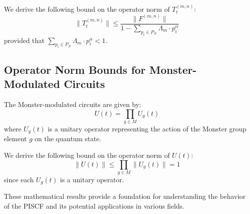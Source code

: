 \documentclass{article}
\theoremstyle{plain}
\begin{document}
We derive the following bound on the operator norm of $T_t^{(m,n)}$:
\begin{equation}
\|T_t^{(m,n)}\| \leq \frac{\|F^{(m,n)}\|}{1 - \sum_{p_i \in P_N} \Lambda_m \cdot p_i^\alpha}
\end{equation}
provided that $\sum_{p_i \in P_N} \Lambda_m \cdot p_i^\alpha < 1$.

\subsection{Operator Norm Bounds for Monster-Modulated Circuits}

The Monster-modulated circuits are given by:
\begin{equation}
U(t) = \prod_{g \in M} U_g(t)
\end{equation}
where $U_g(t)$ is a unitary operator representing the action of the Monster group element $g$ on the quantum state.

We derive the following bound on the operator norm of $U(t)$:
\begin{equation}
\|U(t)\| \leq \prod_{g \in M} \|U_g(t)\| = 1
\end{equation}
since each $U_g(t)$ is a unitary operator.

These mathematical results provide a foundation for understanding the behavior of the PISCF and its potential applications in various fields.
\nocite{*}


\end{document}
